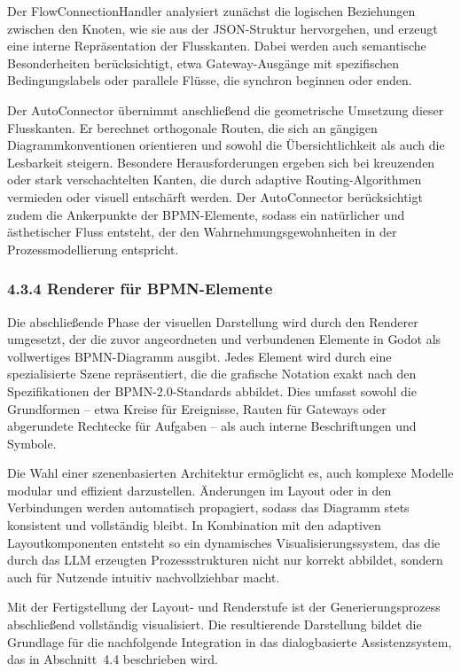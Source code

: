 \documentclass[a4paper,12pt]{scrreprt}
\begin{document}
Der FlowConnectionHandler analysiert zunächst die logischen Beziehungen zwischen den Knoten, wie sie aus der JSON-Struktur hervorgehen, und erzeugt eine interne Repräsentation der Flusskanten. Dabei werden auch semantische  Besonderheiten berücksichtigt, etwa Gateway-Ausgänge mit spezifischen Bedingungslabels oder parallele Flüsse, die synchron beginnen oder enden.

Der AutoConnector übernimmt anschließend die geometrische Umsetzung dieser Flusskanten. Er berechnet orthogonale Routen, die sich an gängigen Diagrammkonventionen orientieren und sowohl die Übersichtlichkeit als auch die  Lesbarkeit steigern. Besondere Herausforderungen ergeben sich bei kreuzenden oder stark verschachtelten Kanten, die durch adaptive Routing-Algorithmen vermieden oder visuell entschärft werden. Der AutoConnector berücksichtigt  zudem die Ankerpunkte der BPMN-Elemente, sodass ein natürlicher und ästhetischer Fluss entsteht, der den Wahrnehmungsgewohnheiten in der Prozessmodellierung entspricht.

\subsubsection*{4.3.4 Renderer für BPMN-Elemente}

Die abschließende Phase der visuellen Darstellung wird durch den Renderer umgesetzt, der die zuvor angeordneten und verbundenen Elemente in Godot als vollwertiges BPMN-Diagramm ausgibt. Jedes Element wird durch eine spezialisierte Szene repräsentiert, die die grafische Notation exakt nach den Spezifikationen der BPMN-2.0-Standards abbildet. Dies umfasst sowohl die Grundformen – etwa Kreise für Ereignisse, Rauten für Gateways oder 
abgerundete Rechtecke für Aufgaben – als auch interne Beschriftungen und Symbole.

Die Wahl einer szenenbasierten Architektur ermöglicht es, auch komplexe Modelle modular und effizient darzustellen. Änderungen im Layout oder in den Verbindungen werden automatisch propagiert, sodass das Diagramm stets konsistent und vollständig bleibt. In Kombination mit den adaptiven Layoutkomponenten entsteht so ein dynamisches Visualisierungssystem, das die durch das LLM erzeugten Prozessstrukturen nicht nur korrekt abbildet, sondern auch für Nutzende intuitiv nachvollziehbar macht.

Mit der Fertigstellung der Layout- und Renderstufe ist der Generierungsprozess abschließend vollständig visualisiert. Die resultierende Darstellung bildet die Grundlage für die nachfolgende Integration in das dialogbasierte 
Assistenzsystem, das in Abschnitt~4.4 beschrieben wird.
\end{document}
